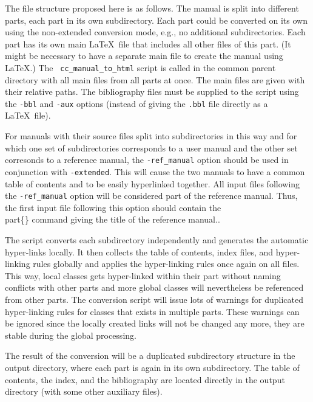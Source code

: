 \documentclass[11pt]{article}
\begin{document}
The file structure proposed here is as follows. The manual is split
into different parts, each part in its own subdirectory. Each part
could be converted on its own using the non-extended conversion mode, e.g., no
additional subdirectories. Each part has its own main \LaTeX\ file
that includes all other files of this part. (It might be necessary to
have a separate main file to create the manual using \LaTeX.) The {\tt
  cc\_manual\_to\_html} script is called in the common parent
directory with all main files from all parts at once.  The main files
are given with their relative paths. The bibliography files must be
supplied to the script using the {\tt -bbl} and {\tt -aux} options
(instead of giving the {\tt *.bbl} file directly as a \LaTeX\ file).

For manuals with their source files split into subdirectories in this
way and for which one set of subdirectories corresponds to a user manual
and the other set corresonds to a reference manual, the {\tt -ref\_manual}
option should be used in conjunction with {\tt -extended}.  This will 
cause the two manuals to have a common table of contents and to be
easily hyperlinked together.  All input files following the {\tt -ref\_manual}
option will be considered part of the reference manual.  Thus, the first 
input file following this option should contain the 
{\texttt \\part\{<part title>\}} command giving the title of the reference 
manual.. 

The script converts each subdirectory independently and generates the
automatic hyper-links locally. It then collects the table of contents,
index files, and hyper-linking rules globally and applies the
hyper-linking rules once again on all files. This way, local classes
gets hyper-linked within their part without naming conflicts with other
parts and more global classes will nevertheless be referenced from
other parts. The conversion script will issue lots of warnings for
duplicated hyper-linking rules for classes that exists in multiple
parts. These warnings can be ignored since the locally created links
will not be changed any more, they are stable during the global
processing.

The result of the conversion will be a duplicated subdirectory
structure in the output directory, where each part is again in its own
subdirectory. The table of contents, the index, and the bibliography
are located directly in the output directory (with some other
auxiliary files).
\end{document}
